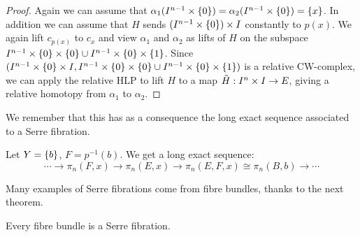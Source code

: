 \begin{proof}
Again we can assume that $\alpha_1(I^{n-1}\times\{0\})=\alpha_2(I^{n-1}\times\{0\})=\{x\}$. In addition we can assume that $H$ sends $(I^{n-1}\times\{0\})\times I$ constantly to $p(x)$. We again lift $c_{p(x)}$ to $c_x$ and view $\alpha_1$ and $\alpha_2$ as lifts of $H$ on the subspace $I^{n-1}\times\{0\}\times\{0\}\cup I^{n-1}\times\{0\}\times\{1\}$. Since $(I^{n-1}\times\{0\}\times I,I^{n-1}\times\{0\}\times\{0\}\cup I^{n-1}\times\{0\}\times\{1\})$ is a relative CW-complex, we can apply the relative HLP to lift $H$ to a map $\tilde H:I^n\times I\to E$, giving a relative homotopy from $\alpha_1$ to $\alpha_2$.
\end{proof}

We remember that this has as a consequence the long exact sequence associated to a Serre fibration.

\begin{theorem}
Let $Y=\{b\}$, $F=p^{-1}(b)$. We get a long exact sequence:
\[\cdots\to\pi_n(F,x)\to\pi_n(E,x)\to\pi_n(E,F,x)\cong\pi_n(B,b)\to\cdots\]
\end{theorem}

Many examples of Serre fibrations come from fibre bundles, thanks to the next theorem.

\begin{theorem}
Every fibre bundle is a Serre fibration.
\end{theorem}

